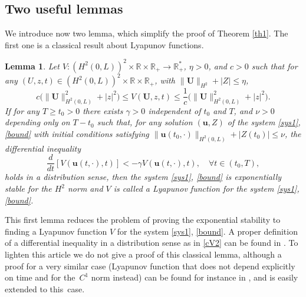 \documentclass[11pt]{article}
\numberwithin{equation}{section}
\newtheorem{lem}[thm]{Lemma}
\theoremstyle{definition}
\begin{document}
\subsection{Two useful lemmas}
We introduce now two lemma, which simplify the proof of Theorem \ref{th1}. The first one is a classical result about Lyapunov functions.
\begin{lem}
Let $V: (H^{2}(0,L))^{2}\times\mathbb{R}\times\mathbb{R}_{+}\to \mathbb{R}_{+}^{*}$, {$\eta>0$,} and $c>0$ such that for any $(U,z,t)\in (H^{2}(0,L))^{2}\times\mathbb{R}\times\mathbb{R}_{+}$, {with $\|\boldsymbol{U}\|_{H^{2}}+|Z|\leq \eta$,}
\begin{equation}
c\bigl(\lVert \boldsymbol{U} \rVert_{H^{2}(0,L)}^{{2}}+|z|^{{2}}\bigr)\leq V(\boldsymbol{U},z,t)\leq \frac{1}{c} \bigl(\lVert \boldsymbol{U} \rVert_{H^{2}(0,L)}^{{2}}+|z|^{{2}}\bigr).
\label{cV1}
\end{equation}
If {for any $T\geq t_{0}>0$} there exists $\gamma>0$ {independent of $t_{0}$ and $T$,}
and ${\nu}>0$ {depending only on $T-t_{0}$} such that, for
any solution
$(\boldsymbol{u},Z)$ of the system \eqref{sys1}, \eqref{bound} with initial conditions
satisfying $\lVert \boldsymbol{u}({t_{0}},\cdot)\rVert_{H^{2}(0,L)}+|Z({t_{0}})|\leq {\nu}$, {the differential inequality}
\begin{equation}
\frac{d}{dt}\left[V(\boldsymbol{u}(t,\cdot),t)\right]<-\gamma V(\boldsymbol{u}(t,\cdot),t),\quad\forall t\in(t_{0},T),
\label{cV2}
\end{equation}
{holds} in a distribution sense, then the system \eqref{sys1}, \eqref{bound} is exponentially stable for the $H^{2}$ norm and $V$ is called a Lyapunov function for the system \eqref{sys1}, \eqref{bound}.
\label{lem1}
\end{lem}
This first lemma reduces the problem of proving the exponential stability to finding a Lyapunov function $V$ for the system \eqref{sys1}, \eqref{bound}. A proper definition of a differential inequality in a distribution sense as in \eqref{cV2} can be found in \cite{C1}. To lighten this article we do not give a proof of this classical lemma, although a proof for a very similar case (Lyapunov function that does not depend explicitly on time and for the~$C^{1}$ norm instead) can be found for instance in \cite[Prop.\,2.1]{C1}, and is easily extended to this~case. 
\end{document}
